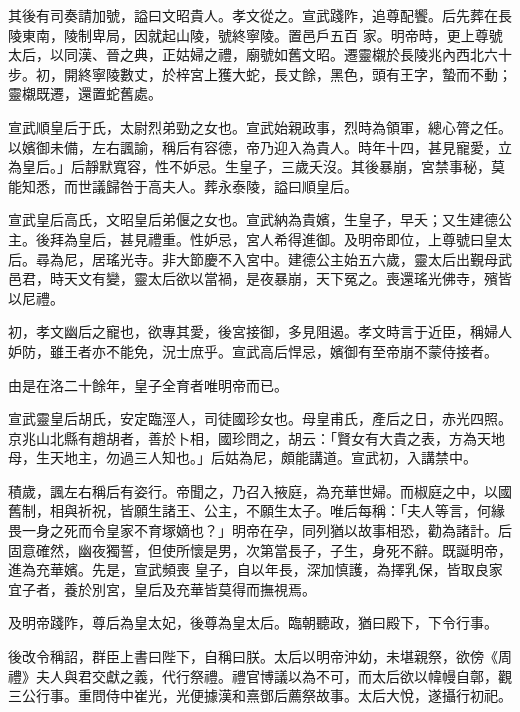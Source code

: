 \begin{pinyinscope}
 其後有司奏請加號，謚曰文昭貴人。孝文從之。宣武踐阼，追尊配饗。后先葬在長陵東南，陵制卑局，因就起山陵，號終寧陵。置邑戶五百
 家。明帝時，更上尊號太后，以同漢、晉之典，正姑婦之禮，廟號如舊文昭。遷靈櫬於長陵兆內西北六十步。初，開終寧陵數丈，於梓宮上獲大蛇，長丈餘，黑色，頭有王字，蟄而不動；靈櫬既遷，還置蛇舊處。



 宣武順皇后于氏，太尉烈弟勁之女也。宣武始親政事，烈時為領軍，總心膂之任。以嬪御未備，左右諷諭，稱后有容德，帝乃迎入為貴人。時年十四，甚見寵愛，立為皇后。」后靜默寬容，性不妒忌。生皇子，三歲夭沒。其後暴崩，宮禁事秘，莫能知悉，而世議歸咎于高夫人。葬永泰陵，謚曰順皇后。



 宣武皇后高氏，文昭皇后弟偃之女也。宣武納為貴嬪，生皇子，早夭；又生建德公主。後拜為皇后，甚見禮重。性妒忌，宮人希得進御。及明帝即位，上尊號曰皇太后。尋為尼，居瑤光寺。非大節慶不入宮中。建德公主始五六歲，靈太后出覲母武邑君，時天文有變，靈太后欲以當禍，是夜暴崩，天下冤之。喪還瑤光佛寺，殯皆以尼禮。



 初，孝文幽后之寵也，欲專其愛，後宮接御，多見阻遏。孝文時言于近臣，稱婦人妒防，雖王者亦不能免，況士庶乎。宣武高后悍忌，嬪御有至帝崩不蒙侍接者。



 由是在洛二十餘年，皇子全育者唯明帝而已。



 宣武靈皇后胡氏，安定臨涇人，司徒國珍女也。母皇甫氏，產后之日，赤光四照。京兆山北縣有趙胡者，善於卜相，國珍問之，胡云：「賢女有大貴之表，方為天地母，生天地主，勿過三人知也。」后姑為尼，頗能講道。宣武初，入講禁中。



 積歲，諷左右稱后有姿行。帝聞之，乃召入掖庭，為充華世婦。而椒庭之中，以國舊制，相與祈祝，皆願生諸王、公主，不願生太子。唯后每稱：「夫人等言，何緣畏一身之死而令皇家不育塚嫡也？」明帝在孕，同列猶以故事相恐，勸為諸計。后固意確然，幽夜獨誓，但使所懷是男，次第當長子，子生，身死不辭。既誕明帝，進為充華嬪。先是，宣武頻喪
 皇子，自以年長，深加慎護，為擇乳保，皆取良家宜子者，養於別宮，皇后及充華皆莫得而撫視焉。



 及明帝踐阼，尊后為皇太妃，後尊為皇太后。臨朝聽政，猶曰殿下，下令行事。



 後改令稱詔，群臣上書曰陛下，自稱曰朕。太后以明帝沖幼，未堪親祭，欲傍《周禮》夫人與君交獻之義，代行祭禮。禮官博議以為不可，而太后欲以幃幔自鄣，觀三公行事。重問侍中崔光，光便據漢和熹鄧后薦祭故事。太后大悅，遂攝行初祀。




\end{pinyinscope}
